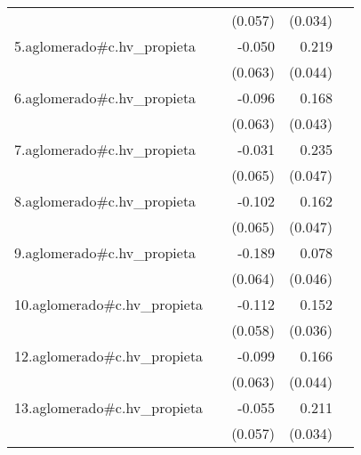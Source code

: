 {\begin{longtable}{l*{4}{D{.}{.}{-1}}}
            &                     &     (0.057)         &     (0.034)         &                     \\
\addlinespace
5.aglomerado#c.hv\_propieta&                     &      -0.050         &       0.219\sym{***}&                     \\
            &                     &     (0.063)         &     (0.044)         &                     \\
\addlinespace
6.aglomerado#c.hv\_propieta&                     &      -0.096         &       0.168\sym{***}&                     \\
            &                     &     (0.063)         &     (0.043)         &                     \\
\addlinespace
7.aglomerado#c.hv\_propieta&                     &      -0.031         &       0.235\sym{***}&                     \\
            &                     &     (0.065)         &     (0.047)         &                     \\
\addlinespace
8.aglomerado#c.hv\_propieta&                     &      -0.102         &       0.162\sym{***}&                     \\
            &                     &     (0.065)         &     (0.047)         &                     \\
\addlinespace
9.aglomerado#c.hv\_propieta&                     &      -0.189\sym{**} &       0.078         &                     \\
            &                     &     (0.064)         &     (0.046)         &                     \\
\addlinespace
10.aglomerado#c.hv\_propieta&                     &      -0.112         &       0.152\sym{***}&                     \\
            &                     &     (0.058)         &     (0.036)         &                     \\
\addlinespace
12.aglomerado#c.hv\_propieta&                     &      -0.099         &       0.166\sym{***}&                     \\
            &                     &     (0.063)         &     (0.044)         &                     \\
\addlinespace
13.aglomerado#c.hv\_propieta&                     &      -0.055         &       0.211\sym{***}&                     \\
            &                     &     (0.057)         &     (0.034)         &                     \\

\end{longtable}}
